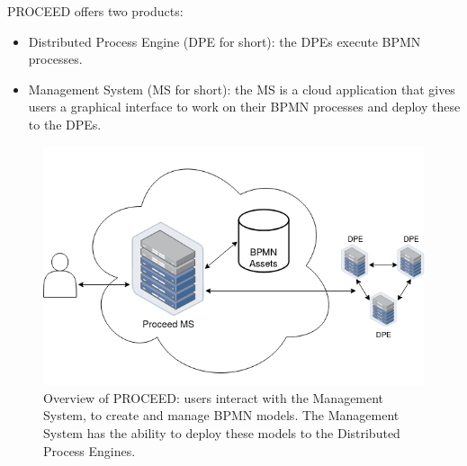 PROCEED offers two products:
\begin{itemize}
    \item Distributed Process Engine (DPE for short): the DPEs execute BPMN processes.
    \item Management System (MS for short): the MS is a cloud application that gives users
      a graphical interface to work on their BPMN processes and deploy these to the DPEs.
\end{itemize}

\begin{figure}[H]
    \centering
    \includegraphics[scale=0.45]{images/quick-ms-overview.drawio.png}
    \caption{Overview of PROCEED: users interact with the Management System, to create and
    manage BPMN models. The Management System has the ability to deploy these models to the Distributed Process Engines.}
    \label{fig:proceed-overview}
    \vspace{-1em} %
\end{figure}



